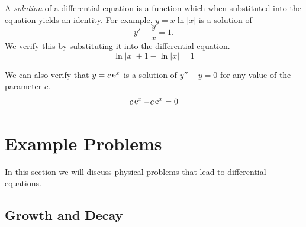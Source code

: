 A \textit{solution} of a differential equation is a function which when 
substituted into the equation yields an identity.  For example,
$y = x \ln |x|$ is a solution of 
\[
y' - \frac{y}{x} = 1.
\]
We verify this by substituting it into the differential equation.
\[
\ln |x| + 1 - \ln |x| = 1
\]

We can also verify that $y = c \mathop{\mathrm{e}}\nolimits^x$ is a solution of $y'' - y  = 0$
for any value of the parameter $c$.
\[
c \mathop{\mathrm{e}}\nolimits^x - c \mathop{\mathrm{e}}\nolimits^x = 0
\]






\section{Example Problems}



In this section we will discuss physical problems that lead 
to differential equations.


\subsection{Growth and Decay}



